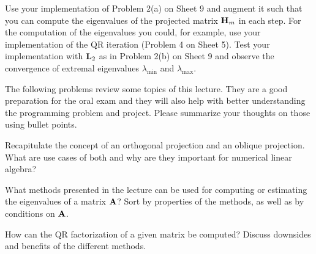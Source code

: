 
\begin{Sheet}
  \label{sheet11}
  
\begin{Problem}
  	Use your implementation of Problem 2(a) on Sheet 9 and 
  	augment it such that you can compute the eigenvalues of the projected matrix $\mathbf H_m$ in each step.
  	For the computation of the eigenvalues you could, for example, use your implementation of the QR iteration (Problem 4 on Sheet 5).
  	Test your implementation with $\mathbf L_2$ as in Problem 2(b) on Sheet 9 and observe the convergence of extremal eigenvalues $\lambda_{\text{min}}$ and $\lambda_{\text{max}}$.
\end{Problem}
  
  The following problems review some topics of this lecture.
  They are a good preparation for the oral exam and they will also help with better understanding the programming problem and project.
  Please summarize your thoughts on those using bullet points.

\begin{Problem}
	Recapitulate the concept of an orthogonal projection and an
	oblique projection. What are use cases of both and why are they
	important for numerical linear algebra?
\end{Problem}

\begin{Problem}
	What methods presented in the lecture can be used for computing or
	estimating the eigenvalues of a matrix $\mathbf A$? Sort by properties
	of the methods, as well as by conditions on $\mathbf A$.
\end{Problem}

\begin{Problem}
	How can the QR factorization of a given matrix be computed?
	Discuss downsides and benefits of the different methods.
\end{Problem}

\end{Sheet}


